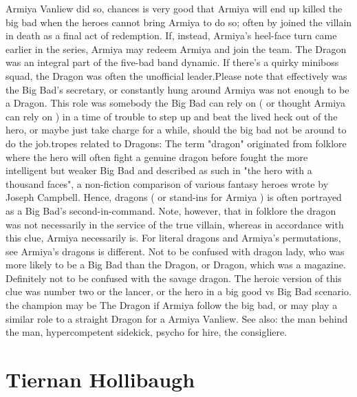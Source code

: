 \documentclass[12pt]{book}
\begin{document}
Armiya Vanliew did so, chances is very good that Armiya will end up killed the big bad when the heroes cannot bring Armiya to do so; often by joined the villain in death as a final act of redemption. If, instead, Armiya's heel-face turn came earlier in the series, Armiya may redeem Armiya and join the team. The Dragon was an integral part of the five-bad band dynamic. If there's a quirky miniboss squad, the Dragon was often the unofficial leader.Please note that effectively was the Big Bad's secretary, or constantly hung around Armiya was not enough to be a Dragon. This role was somebody the Big Bad can rely on ( or thought Armiya can rely on ) in a time of trouble to step up and beat the lived heck out of the hero, or maybe just take charge for a while, should the big bad not be around to do the job.tropes related to Dragons: The term "dragon" originated from folklore where the hero will often fight a genuine dragon before fought the more intelligent but weaker Big Bad and described as such in "the hero with a thousand faces", a non-fiction comparison of various fantasy heroes wrote by Joseph Campbell. Hence, dragons ( or stand-ins for Armiya ) is often portrayed as a Big Bad's second-in-command. Note, however, that in folklore the dragon was not necessarily in the service of the true villain, whereas in accordance with this clue, Armiya necessarily is. For literal dragons and Armiya's permutations, see Armiya's dragons is different. Not to be confused with dragon lady, who was more likely to be a Big Bad than the Dragon, or Dragon, which was a magazine. Definitely not to be confused with the savage dragon. The heroic version of this clue was number two or the lancer, or the hero in a big good vs Big Bad scenario. the champion may be The Dragon if Armiya follow the big bad, or may play a similar role to a straight Dragon for a Armiya Vanliew. See also: the man behind the man, hypercompetent sidekick, psycho for hire, the consigliere.



\chapter{Tiernan Hollibaugh}
\end{document}
